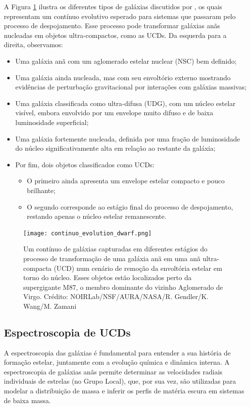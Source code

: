 A Figura \ref{continuo_evolution_dwarf} ilustra os diferentes tipos de galáxias discutidos por \cite{Wang_2023}, os quais representam um contínuo evolutivo esperado para sistemas que passaram pelo processo de despojamento. Esse processo pode transformar galáxias anãs nucleadas em objetos ultra-compactos, como as UCDs. Da esquerda para a direita, observamos:

\begin{itemize}
    \item Uma galáxia anã com um aglomerado estelar nuclear (NSC) bem definido;
    \item Uma galáxia ainda nucleada, mas com seu envoltório externo mostrando evidências de perturbação gravitacional por interações com galáxias massivas;
    \item Uma galáxia classificada como ultra-difusa (\ac{UDG}), com um núcleo estelar visível, embora envolvido por um envelope muito difuso e de baixa luminosidade superficial;
    \item Uma galáxia fortemente nucleada, definida por uma fração de luminosidade do núcleo significativamente alta em relação ao restante da galáxia;
    \item Por fim, dois objetos classificados como UCDs:
    \begin{itemize}
        \item O primeiro ainda apresenta um envelope estelar compacto e pouco brilhante;
        \item O segundo corresponde ao estágio final do processo de despojamento, restando apenas o núcleo estelar remanescente.
    \end{itemize}
\end{itemize}


\begin{figure}[!ht]
    \centering
    \texttt{[image: continuo\_evolution\_dwarf.png]} 
    \caption[]{Um contínuo de galáxias capturadas em diferentes estágios do processo de transformação de uma galáxia anã em uma anã ultra-compacta (UCD) num cenário de remoção da envoltória estelar em torno do núcleo. Esses objetos estão localizados perto da supergigante M87, o membro dominante do vizinho Aglomerado de Virgo. Crédito: NOIRLab/NSF/AURA/NASA/R. Gendler/K. Wang/M. Zamani}
    \label{continuo_evolution_dwarf}
\end{figure}

\subsection{Espectroscopia de UCDs}\label{subsec:espectroscopia}
A espectroscopia das galáxias é fundamental para entender a sua história de formação estelar, juntamente com a evolução química e dinâmica interna. A espectroscopia de galáxias anãs permite determinar as velocidades radiais individuais de estrelas (no Grupo Local), que, por sua vez, são utilizadas para modelar a distribuição de massa e inferir os perfis de matéria escura em sistemas de baixa massa. 


